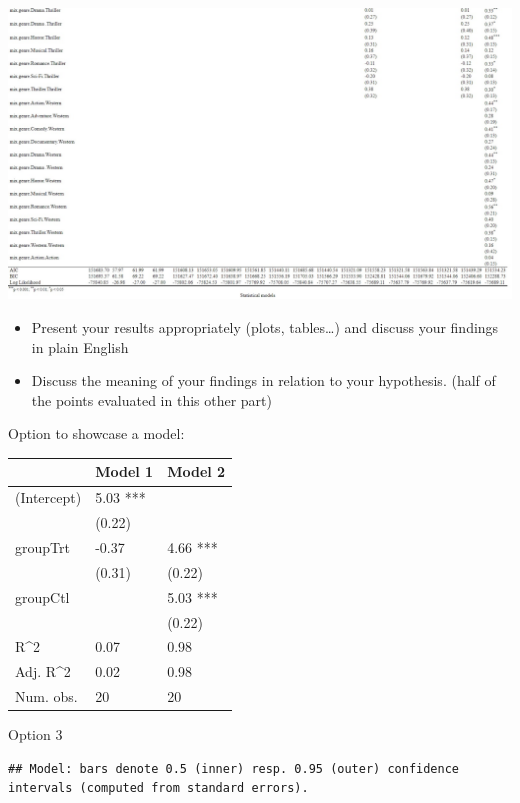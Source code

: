 \documentclass[
  man]{apa6}
\begin{document}
\includegraphics{ergm_images/model_result4.jpeg}

\begin{itemize}
\item
  Present your results appropriately (plots, tables\ldots) and discuss
  your findings in plain English
\item
  Discuss the meaning of your findings in relation to your hypothesis.
  (half of the points evaluated in this other part)
\end{itemize}

Option to showcase a model:

\begin{tabular}{l|l|l}
\hline
 & Model 1 & Model 2\\
\hline
(Intercept) & 5.03 *** & \\
\hline
 & (0.22) & \\
\hline
groupTrt & -0.37 & 4.66 ***\\
\hline
 & (0.31) & (0.22)\\
\hline
groupCtl &  & 5.03 ***\\
\hline
 &  & (0.22)\\
\hline
R\textasciicircum{}2 & 0.07 & 0.98\\
\hline
Adj. R\textasciicircum{}2 & 0.02 & 0.98\\
\hline
Num. obs. & 20 & 20\\
\hline
\end{tabular}

Option 3

\begin{verbatim}
## Model: bars denote 0.5 (inner) resp. 0.95 (outer) confidence intervals (computed from standard errors).
\end{verbatim}
\end{document}
